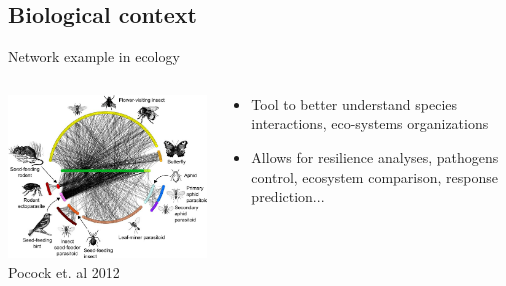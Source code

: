 \documentclass[11pt]{beamer}
\begin{document}
\subsection{Biological context}
\begin{frame}{Network example in ecology}
\begin{columns}
\begin{column}{7.5cm}
\includegraphics[width=8cm]{images/Species-interaction-networks-at-Norwood-Farm-Somerset-UK-revised-from-Pocock-et-al.png}
\footnotesize{Pocock et. al 2012}
\end{column}
\begin{column}{4.5cm}
\begin{itemize}
    \item Tool to better understand species interactions, eco-systems organizations
    \item Allows for resilience analyses, pathogens control, ecosystem comparison, response prediction...
\end{itemize}
\end{column}
\end{columns}
\end{frame}
\end{document}
